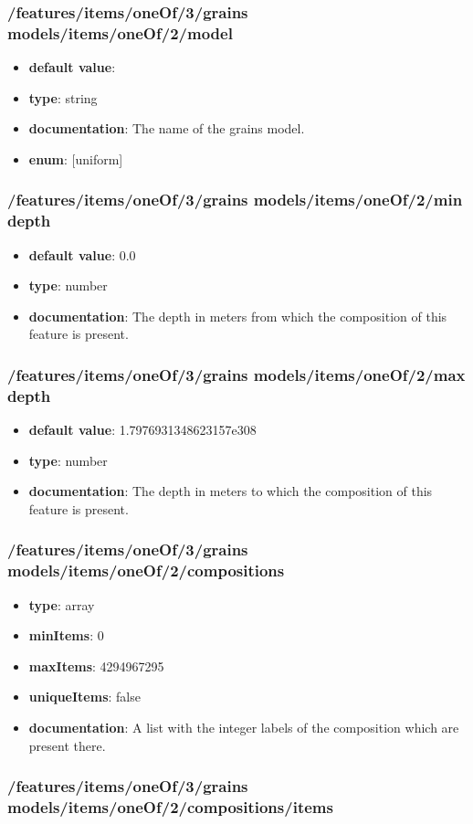 \subsubsection{/features/items/oneOf/3/grains models/items/oneOf/2/model}
\begin{itemize}\item {\bf default value}: 
\item {\bf type}: string
\item {\bf documentation}: The name of the grains model.
\item {\bf enum}: [uniform]\end{itemize}\subsubsection{/features/items/oneOf/3/grains models/items/oneOf/2/min depth}
\begin{itemize}\item {\bf default value}: 0.0
\item {\bf type}: number
\item {\bf documentation}: The depth in meters from which the composition of this feature is present.
\end{itemize}\subsubsection{/features/items/oneOf/3/grains models/items/oneOf/2/max depth}
\begin{itemize}\item {\bf default value}: 1.7976931348623157e308
\item {\bf type}: number
\item {\bf documentation}: The depth in meters to which the composition of this feature is present.
\end{itemize}\subsubsection{/features/items/oneOf/3/grains models/items/oneOf/2/compositions}
\begin{itemize}\item {\bf type}: array
\item {\bf minItems}: 0
\item {\bf maxItems}: 4294967295
\item {\bf uniqueItems}: false
\item {\bf documentation}: A list with the integer labels of the composition which are present there.
\end{itemize}\subsubsection{/features/items/oneOf/3/grains models/items/oneOf/2/compositions/items}
